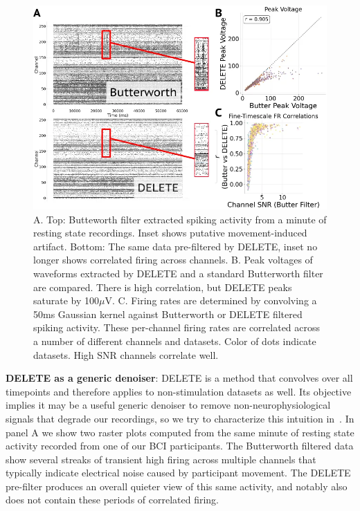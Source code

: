 \documentclass[12pt,oneside]{report}
\begin{document}
\begin{figure}[h]
  \centering
  \includegraphics[width=0.8\linewidth]{ch4_delete_generic.png}
  \caption{A. Top: Butteworth filter extracted spiking activity from a minute of resting state recordings. Inset shows putative movement-induced artifact. Bottom: The same data pre-filtered by DELETE, inset no longer shows correlated firing across channels. B. Peak voltages of waveforms extracted by DELETE and a standard Butterworth filter are compared. There is high correlation, but DELETE peaks saturate by 100$\mu$V. C. Firing rates are determined by convolving a 50ms Gaussian kernel against Butterworth or DELETE filtered spiking activity. These per-channel firing rates are correlated across a number of different channels and datasets. Color of dots indicate datasets. High SNR channels correlate well.}
  \label{fig:delete_generic}
\end{figure}

\textbf{DELETE as a generic denoiser}: DELETE is a method that convolves over all timepoints and therefore applies to non-stimulation datasets as well. Its objective implies it may be a useful generic denoiser to remove non-neurophysiological signals that degrade our recordings, so we try to characterize this intuition in~. In panel A we show two raster plots computed from the same minute of resting state activity recorded from one of our BCI participants. The Butterworth filtered data show several streaks of transient high firing across multiple channels that typically indicate electrical noise caused by participant movement. The DELETE pre-filter produces an overall quieter view of this same activity, and notably also does not contain these periods of correlated firing.
\end{document}
